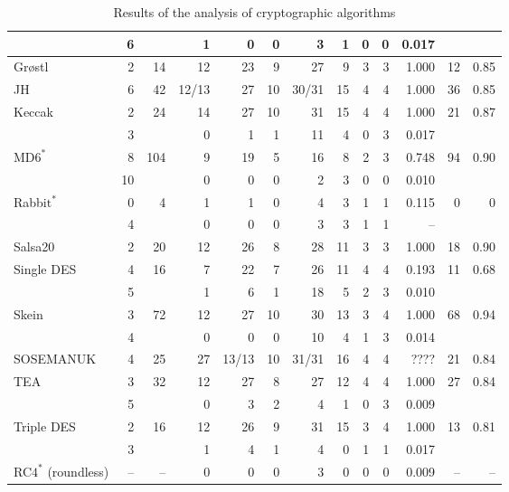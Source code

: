 \documentclass[
  digital,  	%
  color,		%
  oneside,   	%
  12pt,
  nocover,
  notable,
  nolof,
  nolot,
]{fithesis3}
\newcommand{\rd}{\cellcolor{red!40}}
\theoremstyle{definition}
\theoremstyle{remark}
\begin{document}
\begin{table}[H]
\begin{nomar}
{\begin{tabular}{@{}lrrrrrrrrrrrr@{}}
           &  6 &     &  1 &  0 &  0 &  3 &  1 &  0 &  0 & 0.017 &  & \\ \midrule
Gr\o stl   &  2 &  14 & \rd12 & \rd23 &  \rd9 & \rd27 &  \rd9 &  \rd3 &  \rd3 & \rd1.000 & 12 & 0.85 \\ \midrule
JH         &  6 &  42 &\rd12/13& \rd27 & \rd10 &\rd30/31& \rd15 &  \rd4 &  \rd4 & \rd1.000 & 36 & 0.85 \\ \midrule
Keccak     &  2 &  24 & \rd14 & \rd27 & \rd10 & \rd31 & \rd15 &  \rd4 &  \rd4 & \rd1.000 & 21 & 0.87 \\
           &  3 &     &  0 &  1 &  1 & \rd11 &  \rd4 &  0 &  \rd3 & 0.017 &  & \\ \midrule
MD$\text{6}^{\ast}$         &  8 & 104 &  \rd9 & \rd19 &  \rd5 & \rd16 &  \rd8 &  \rd2 &  \rd3 & \rd0.748 & 94 & 0.90 \\
           & 10 &     &  0 &  0 &  0 &  2 &  \rd3 &  0 &  0 & 0.010 &  & \\ \midrule
Rabbi$\text{t}^{\ast}$      &  0 &   4 &  1 &  1 &  0 &  \rd4 &  \rd3 &  1 &  1 & 0.115 & 0 & 0 \\
           &  4 &     &  0 &  0 &  0 &  3 &  \rd3 &  1 &  1 & --    &  & \\ \midrule
Salsa20    &  2 &  20 & \rd12 & \rd26 &  \rd8 & \rd28 & \rd11 &  \rd3 &  \rd3 & \rd1.000 & 18 & 0.90 \\ \midrule
Single DES &  4 &  16 &  \rd7 & \rd22 &  \rd7 & \rd26 & \rd11 &  \rd4 &  \rd4 & \rd0.193 & 11 & 0.68 \\
           &  5 &     &  1 &  \rd6 &  1 & \rd18 &  \rd5 &  \rd2 &  \rd3 & 0.010 &  & \\ \midrule
Skein      &  3 &  72 & \rd12 & \rd27 & \rd10 & \rd30 & \rd13 &  \rd3 &  \rd4 & \rd1.000 & 68 & 0.94 \\
           &  4 &     &  0 &  0 &  0 & \rd10 &  \rd4 &  1 &  \rd3 & 0.014 &  & \\ \midrule
SOSEMANUK  &  4 &  25 & \rd27 &\rd13/13& \rd10 &\rd31/31& \rd16 & \rd4  &  \rd4 & ????  & 21 & 0.84 \\ \midrule
TEA        &  3 &  32 & \rd12 & \rd27 &  \rd8 & \rd27 & \rd12 &  \rd4 &  \rd4 & \rd1.000 & 27 & 0.84 \\
           &  5 &     &  0 &  3 &  2 &  \rd4 &  1 &  0 &  \rd3 & 0.009 &  & \\ \midrule
Triple DES &  2 &  16 & 1\rd2 & \rd26 &  \rd9 & \rd31 & \rd15 &  \rd3 &  \rd4 & \rd1.000 & 13 & 0.81 \\
           &  3 &     &  1 &  \rd4 &  1 &  \rd4 &  0 &  1 &  1 & 0.017 &  & \\ \midrule
RC$\text{4}^{\ast}$  (roundless) & -- & -- & 0 & 0 & 0 & 3 & 0 & 0 & 0 & 0.009 & -- & -- \\
\bottomrule
\end{tabular}
}

\end{nomar}
\caption{Results of the analysis of cryptographic algorithms}
\label{tab:crypto_alg_analysis}
\end{table}
\end{document}

